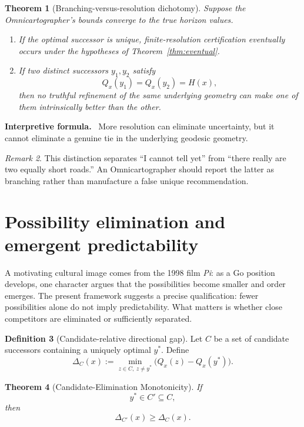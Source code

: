 \documentclass[11pt]{article}
\newtheorem{theorem}{Theorem}[section]
\theoremstyle{definition}
\newtheorem{definition}[theorem]{Definition}
\theoremstyle{remark}
\newtheorem{remark}[theorem]{Remark}
\newcommand{\Qval}{Q}
\newcommand{\Gap}{\Delta}
\newenvironment{interpretiveformula}{%
  \begin{center}\begin{minipage}{0.92\textwidth}\small
  \textbf{Interpretive formula.}\ }{\end{minipage}\end{center}}
\begin{document}
\begin{theorem}[Branching-versus-resolution dichotomy]
Suppose the Omnicartographer's bounds converge to the true horizon values.
\begin{enumerate}[label=(\roman*)]
\item If the optimal successor is unique, finite-resolution certification eventually occurs under the hypotheses of Theorem~\ref{thm:eventual}.
\item If two distinct successors $y_1,y_2$ satisfy
\[
\Qval_x(y_1)=\Qval_x(y_2)=H(x),
\]
then no truthful refinement of the same underlying geometry can make one of them intrinsically better than the other.
\end{enumerate}
\end{theorem}

\begin{interpretiveformula}
More resolution can eliminate uncertainty, but it cannot eliminate a genuine tie in the underlying geodesic geometry.
\end{interpretiveformula}

\begin{remark}
This distinction separates ``I cannot tell yet'' from ``there really are two equally short roads.'' An Omnicartographer should report the latter as branching rather than manufacture a false unique recommendation.
\end{remark}

\section{Possibility elimination and emergent predictability}
A motivating cultural image comes from the 1998 film \emph{Pi}: as a Go position develops, one character argues that the possibilities become smaller and order emerges. The present framework suggests a precise qualification: fewer possibilities alone do not imply predictability. What matters is whether close competitors are eliminated or sufficiently separated.

\begin{definition}[Candidate-relative directional gap]
Let $C$ be a set of candidate successors containing a uniquely optimal $y^*$. Define
\[
\Gap_C(x):=\min_{z\in C,\ z\neq y^*}\bigl(\Qval_x(z)-\Qval_x(y^*)\bigr).
\]
\end{definition}

\begin{theorem}[Candidate-Elimination Monotonicity]
If
\[
y^*\in C'\subseteq C,
\]
then
\[
\boxed{\Gap_{C'}(x)\ge\Gap_C(x)}.
\]
\end{theorem}
\end{document}
